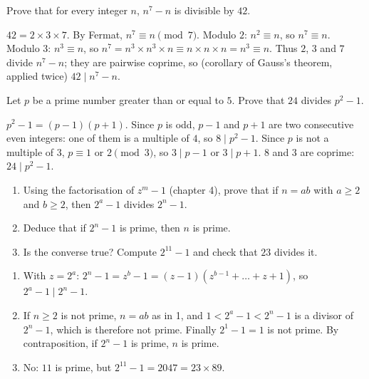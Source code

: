 \begin{exercise}[Divisible by $42$]
Prove that for every integer $n$, $n^7-n$ is divisible by $42$.
\end{exercise}
\begin{solution}
$42=2\times3\times7$. By Fermat, $n^7\equiv n\pmod7$. Modulo $2$: $n^2\equiv n$, so $n^7\equiv n$. Modulo $3$: $n^3\equiv n$, so $n^7=n^3\times n^3\times n\equiv n\times n\times n=n^3\equiv n$. Thus $2$, $3$ and $7$ divide $n^7-n$; they are pairwise coprime, so (corollary of Gauss's theorem, applied twice) $42\mid n^7-n$.
\end{solution}

\begin{exercise}
Let $p$ be a prime number greater than or equal to $5$. Prove that $24$ divides $p^2-1$.
\end{exercise}
\begin{solution}
$p^2-1=(p-1)(p+1)$. Since $p$ is odd, $p-1$ and $p+1$ are two consecutive even integers: one of them is a multiple of $4$, so $8\mid p^2-1$. Since $p$ is not a multiple of $3$, $p\equiv1$ or $2\pmod3$, so $3\mid p-1$ or $3\mid p+1$. $8$ and $3$ are coprime: $24\mid p^2-1$.
\end{solution}

\begin{exercise}
\begin{enumerate}
\item Using the factorisation of $z^m-1$ (chapter 4), prove that if $n=ab$ with $a\ge2$ and $b\ge2$, then $2^a-1$ divides $2^n-1$.
\item Deduce that if $2^n-1$ is prime, then $n$ is prime.
\item Is the converse true? Compute $2^{11}-1$ and check that $23$ divides it.
\end{enumerate}
\end{exercise}
\begin{solution}
\begin{enumerate}
\item With $z=2^a$: $2^n-1=z^b-1=(z-1)\left(z^{b-1}+\dots+z+1\right)$, so $2^a-1\mid2^n-1$.
\item If $n\ge2$ is not prime, $n=ab$ as in 1, and $1<2^a-1<2^n-1$ is a divisor of $2^n-1$, which is therefore not prime. Finally $2^1-1=1$ is not prime. By contraposition, if $2^n-1$ is prime, $n$ is prime.
\item No: $11$ is prime, but $2^{11}-1=\num{2047}=23\times89$.
\end{enumerate}
\end{solution}

